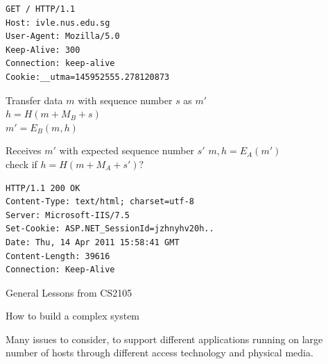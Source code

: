 

\begin{frame}[fragile]\footnotesize
\begin{verbatim}
GET / HTTP/1.1
Host: ivle.nus.edu.sg
User-Agent: Mozilla/5.0 
Keep-Alive: 300
Connection: keep-alive
Cookie:__utma=145952555.278120873
\end{verbatim}
\end{frame}

\begin{cf}
	Transfer data $m$ with sequence number $s$ as $m'$\\
  \vspace{1cm}
	$h = H(m + M_B + s)$\\
	$m' = E_B (m, h)$\\
\end{cf}


\begin{cf}
	Receives $m'$ with expected sequence number $s'$
  \vspace{1cm}
	$m, h = E_A(m')$\\
	check if $h = H(m + M_A + s') ?$\\
\end{cf}

\begin{frame}[fragile]\footnotesize
\begin{verbatim}
HTTP/1.1 200 OK
Content-Type: text/html; charset=utf-8
Server: Microsoft-IIS/7.5
Set-Cookie: ASP.NET_SessionId=jzhnyhv20h..
Date: Thu, 14 Apr 2011 15:58:41 GMT
Content-Length: 39616
Connection: Keep-Alive
\end{verbatim}
\end{frame}



\begin{cf}
	General Lessons from CS2105
\end{cf}

\begin{cf}
	How to build a complex system
\end{cf}

\begin{frame}\begin{center}\normalsize
Many issues to consider, to support different applications running on large number of hosts through different access technology and physical media.
\end{center}\end{frame}

